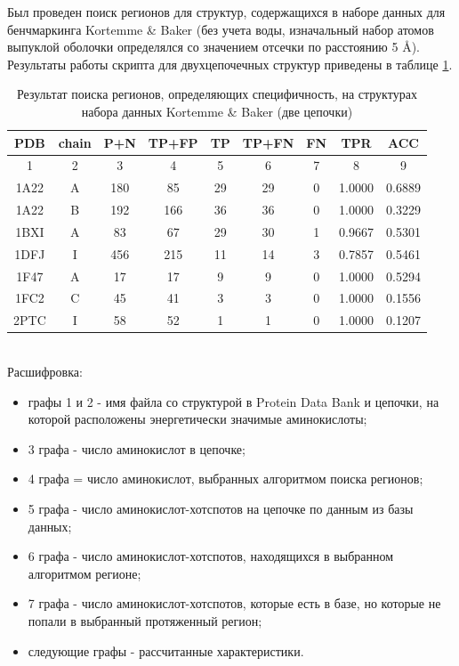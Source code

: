 Был проведен поиск регионов для структур, содержащихся в наборе данных для бенчмаркинга Kortemme \& Baker \cite{kortemme_alascan_datasets} (без учета воды, изначальный набор атомов выпуклой оболочки определялся со значением отсечки по расстоянию 5 \AA{}). Результаты работы скрипта для двухцепочечных структур приведены в таблице \ref{tab:comparison}.
\begin{table}[h]
\begin{center}
\caption{Результат поиска регионов, определяющих специфичность, на структурах набора данных Kortemme \& Baker (две цепочки) }
\label{tab:comparison}
\begin{tabular}{|c|c|c|c|c|c|c|c|c|}
\hline
 PDB & chain & P+N & TP+FP & TP & TP+FN & FN & TPR & ACC \\
 \hline
  1 & 2 & 3 & 4 & 5 & 6 & 7 & 8 & 9 \\
 \hline
1A22 & A & 180 & 85 & 29 & 29 & 0 & 1.0000 & 0.6889\\
1A22 & B & 192 & 166 & 36 & 36 & 0 & 1.0000 & 0.3229\\
1BXI & A & 83 & 67 & 29 & 30 & 1 & 0.9667 & 0.5301\\
1DFJ & I & 456 & 215 & 11 & 14 & 3 & 0.7857 & 0.5461\\
1F47 & A & 17 & 17 & 9 & 9 & 0 & 1.0000 & 0.5294\\
1FC2 & C & 45 & 41 & 3 & 3 & 0 & 1.0000 & 0.1556\\
2PTC & I & 58 & 52 & 1 & 1 & 0 & 1.0000 & 0.1207\\
\hline
\end{tabular}
\end{center}
\end{table}
\\[10pt]
Расшифровка: 
\begin{itemize}
\item графы 1 и 2 - имя файла со структурой в Protein Data Bank и цепочки, на которой расположены энергетически значимые аминокислоты;
\item 3 графа - число аминокислот в цепочке;
\item 4 графа = число аминокислот, выбранных алгоритмом поиска регионов;
\item 5 графа - число аминокислот-хотспотов на цепочке по данным из базы данных;
\item 6 графа - число аминокислот-хотспотов, находящихся в выбранном алгоритмом регионе;
\item 7 графа - число аминокислот-хотспотов, которые есть в базе, но которые не попали в выбранный протяженный регион;
\item следующие графы - рассчитанные характеристики.
\end{itemize}

